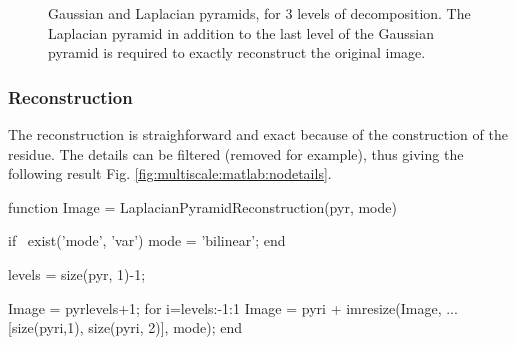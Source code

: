 \begin{figure}[htbp]
 \hfill
 \hfill
 \caption{Gaussian and Laplacian pyramids, for 3 levels of decomposition. The Laplacian pyramid in addition to the last level of the Gaussian pyramid is required to exactly reconstruct the original image.}
 \label{fig:multiscale:matlab:glpyramid}
\end{figure}

\subsubsection{Reconstruction}
The reconstruction is straighforward and exact because of the construction of the residue. The details can be filtered (removed for example), thus giving the following result Fig. \ref{fig:multiscale:matlab:nodetails}.

\begin{matlab}
function Image = LaplacianPyramidReconstruction(pyr, mode)

if ~exist('mode', 'var')
    mode = 'bilinear';
end

levels = size(pyr, 1)-1;

Image = pyr{levels+1};
for i=levels:-1:1
    Image = pyr{i} + imresize(Image, ...
                     [size(pyr{i},1), size(pyr{i}, 2)], mode);
end
\end{matlab}

